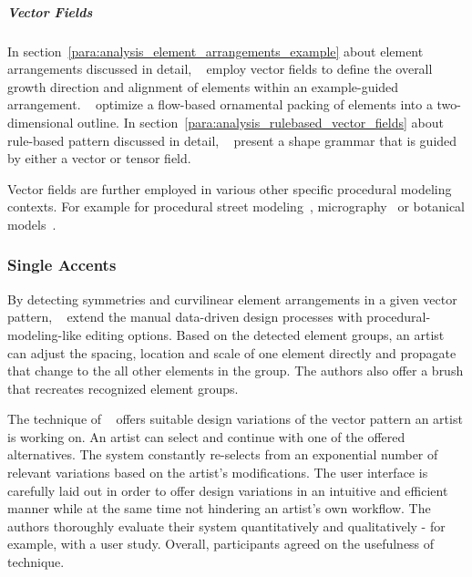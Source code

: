 \subparagraph{Vector Fields}
\label{subpara:analysis_connections_branches_and_directionality_vectorfields}

In section~\ref{para:analysis_element_arrangements_example} about element arrangements discussed in detail, \citeauthor*{ijiri_2008_aeb}~\cite{ijiri_2008_aeb} employ vector fields to define the overall growth direction and alignment of elements within an example-guided arrangement. \citeauthor*{saputra_2017_ffo}~\cite{saputra_2017_ffo} optimize a flow-based ornamental packing of elements into a two-dimensional outline. In section~\ref{para:analysis_rulebased_vector_fields} about rule-based pattern discussed in detail, \citeauthor*{yuanyuan_2011_gso}~\cite{yuanyuan_2011_gso} present a shape grammar that is guided by either a vector or tensor field.


Vector fields are further employed in various other specific procedural modeling contexts. For example for procedural street modeling~\cite{chen_2008_ips}, micrography~\cite{maharik_2011_dm} or botanical models~\cite{xu_2015_ptm}.



\subsubsection{Single Accents}
\label{subsubsec:analysis_single_accents}

By detecting symmetries and curvilinear element arrangements in a given vector pattern, \citeauthor*{yeh_2009_dsa}~\cite{yeh_2009_dsa} extend the manual data-driven design processes with procedural-modeling-like editing options. Based on the detected element groups, an artist can adjust the spacing, location and scale of one element directly and propagate that change to the all other elements in the group. The authors also offer a brush that recreates recognized element groups.

The technique of \citeauthor*{guerrero_2016_pep}~\cite{guerrero_2016_pep} offers suitable design variations of the vector pattern an artist is working on. An artist can select and continue with one of the offered alternatives. The system constantly re-selects from an exponential number of relevant variations based on the artist's modifications. The user interface is carefully laid out in order to offer design variations in an intuitive and efficient manner while at the same time not hindering an artist's own workflow. The authors thoroughly evaluate their system quantitatively and qualitatively - for example, with a user study. Overall, participants agreed on the usefulness of technique.

